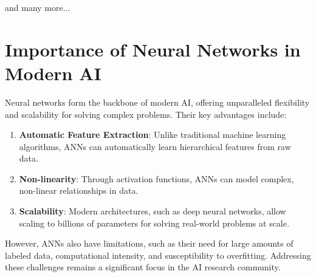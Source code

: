 and many more...

\section{Importance of Neural Networks in Modern AI}
Neural networks form the backbone of modern AI, offering unparalleled flexibility and scalability for solving complex problems. Their key advantages include:
\begin{enumerate}
    \item \textbf{Automatic Feature Extraction}: Unlike traditional machine learning algorithms, ANNs can automatically learn hierarchical features from raw data.
    \item \textbf{Non-linearity}: Through activation functions, ANNs can model complex, non-linear relationships in data.
    \item \textbf{Scalability}: Modern architectures, such as deep neural networks, allow scaling to billions of parameters for solving real-world problems at scale.
\end{enumerate}

However, ANNs also have limitations, such as their need for large amounts of labeled data, computational intensity, and susceptibility to overfitting. Addressing these challenges remains a significant focus in the AI research community.\cite{goodfellow2016deep}

